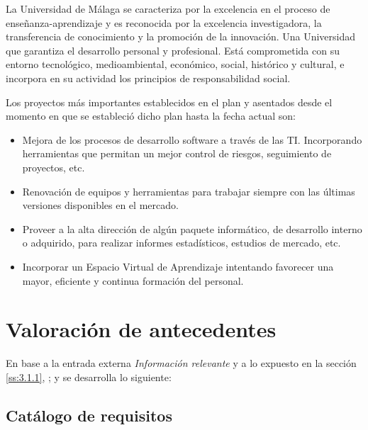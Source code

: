 \documentclass[11pt,a4paper,spanish,twoside]{report}
\begin{document}
La Universidad de Málaga se caracteriza por la excelencia en el proceso de
enseñanza-aprendizaje y es reconocida por la excelencia investigadora, la
transferencia de conocimiento y la promoción de la innovación. Una
Universidad que garantiza el desarrollo personal y profesional. Está
comprometida con su entorno tecnológico, medioambiental, económico, social,
histórico y cultural, e incorpora en su actividad los principios de
responsabilidad social. 

Los proyectos más importantes establecidos en el plan y asentados desde el 
momento en que se estableció dicho plan hasta la fecha actual son: 
\begin{itemize}
\item Mejora de los procesos de desarrollo software a través de las
  TI. Incorporando herramientas que permitan un mejor control de riesgos,
  seguimiento de proyectos, etc.  

\item Renovación de equipos y herramientas para trabajar siempre con las
  últimas versiones disponibles en el mercado.

\item Proveer a la alta dirección de algún paquete informático, de desarrollo
  interno o adquirido, para realizar informes estadísticos, estudios de
  mercado, etc. 

\item Incorporar un Espacio Virtual de Aprendizaje intentando favorecer
  una mayor, eficiente y continua formación del personal.  
\end{itemize}
        
\section{Valoración de antecedentes} 
En base a la entrada externa \emph{Información relevante} y a lo expuesto 
en la sección \vref{ss:3.1.1}, \emph{}; y
se desarrolla lo siguiente:

\subsection{Catálogo de requisitos} \label{ss:3.2.1}
\end{document}
